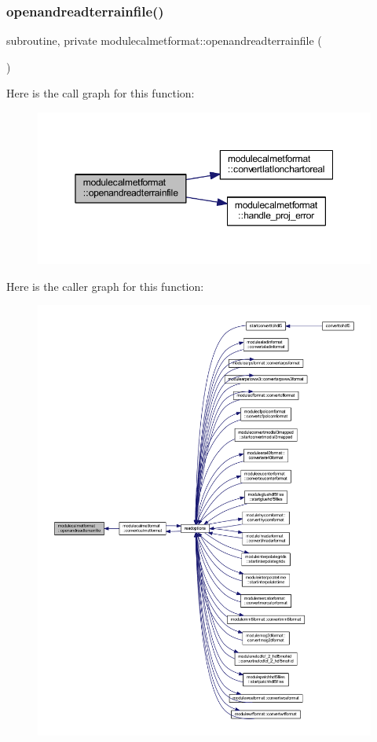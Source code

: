 \subsubsection{\texorpdfstring{openandreadterrainfile()}{openandreadterrainfile()}}
{\footnotesize\ttfamily subroutine, private modulecalmetformat\+::openandreadterrainfile (\begin{DoxyParamCaption}{ }\end{DoxyParamCaption})\hspace{0.3cm}{\ttfamily [private]}}

Here is the call graph for this function\+:\nopagebreak
\begin{figure}[H]
\begin{center}
\leavevmode
\includegraphics[width=350pt]{namespacemodulecalmetformat_a1c6e763c6740cd630346ca11aab5aa78_cgraph}
\end{center}
\end{figure}
Here is the caller graph for this function\+:\nopagebreak
\begin{figure}[H]
\begin{center}
\leavevmode
\includegraphics[width=350pt]{namespacemodulecalmetformat_a1c6e763c6740cd630346ca11aab5aa78_icgraph}
\end{center}
\end{figure}

